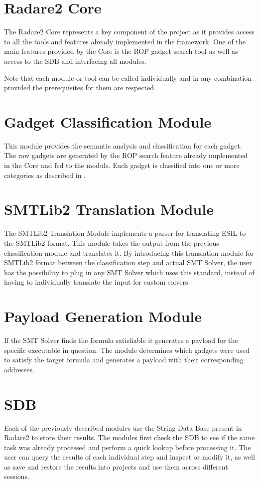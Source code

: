 \section{Radare2 Core}

The Radare2 Core represents a key component of the project as it provides access to all the tools and features already implemented in the framework. One of the main features provided by the Core is the ROP gadget search tool as well as access to the SDB and interfacing all modules.

Note that each module or tool can be called individually and in any combination provided the prerequisites for them are respected.

\section{Gadget Classification Module}

This module provides the semantic analysis and classification for each gadget. The raw gadgets are generated by the ROP search feature already implemented in the Core and fed to the module. Each gadget is classified into one or more categories as described in .

\section{SMTLib2 Translation Module}

The SMTLib2 Translation Module implements a parser for translating ESIL to the SMTLib2 format\cite{barret2015smtlib}. This module takes the output from the previous classification module and translates it. By introducing this translation module for SMTLib2 format between the classification step and actual SMT Solver, the user has the possibility to plug in any SMT Solver which uses this standard, instead of having to individually translate the input for custom solvers.

\section{Payload Generation Module}

If the SMT Solver finds the formula satisfiable it generates a payload for the specific executable in question. The module determines which gadgets were used to satisfy the target formula and generates a payload with their corresponding addresses.

\section{SDB}

Each of the previously described modules use the String Data Base present in Radare2 to store their results. The modules first check the SDB to see if the same task was already processed and perform a quick lookup before processing it. The user can query the results of each individual step and inspect or modify it, as well as save and restore the results into projects and use them across different sessions.

